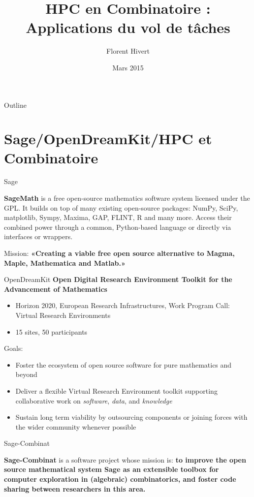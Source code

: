 \documentclass[compress,11pt]{beamer}
\title{\bf\LARGE HPC en Combinatoire :  \\
Applications du vol de tâches\\[5mm]}
\author{Florent Hivert}
\institute[LRI]{
  LRI / Université Paris Sud 11 / CNRS}
\date[Décembre 2014]{Mars 2015}
\begin{document}
\frame{\titlepage}

\begin{frame}{Outline}

  \tableofcontents
\end{frame}


\section{Sage/OpenDreamKit/HPC et Combinatoire}
\begin{frame}{Sage}

  \textbf{SageMath} is a free open-source mathematics software system licensed under
  the GPL. It builds on top of many existing open-source packages: NumPy,
  SciPy, matplotlib, Sympy, Maxima, GAP, FLINT, R and many more. Access their
  combined power through a common, Python-based language or directly via
  interfaces or wrappers.
  \bigskip

  Mission: \textbf{«Creating a viable free open source alternative to Magma, Maple,
  Mathematica and Matlab.»}
\end{frame}

\begin{frame}{OpenDreamKit}
  \textbf{\large Open Digital Research Environment Toolkit for the
    Advancement of Mathematics}
  \begin{itemize}
  \item Horizon 2020, European Research Infrastructures, Work Program
    Call: Virtual Research Environments
  \item 15 sites, 50 participants
  \end{itemize}
  {\color{red} Goals:}
  \begin{itemize}
  \item Foster the ecosystem of open source software for pure mathematics and
    beyond
  \item Deliver a flexible Virtual Research Environment toolkit supporting
    collaborative work on \emph{software}, \emph{data}, and \emph{knowledge}
  \item Sustain long term viability by outsourcing components or joining
    forces with the wider community whenever possible
  \end{itemize}
\end{frame}

\begin{frame}{Sage-Combinat}

  \textbf{Sage-Combinat} is a software project whose mission is: \textbf{to improve
    the open source mathematical system Sage as an extensible toolbox for
    computer exploration in (algebraic) combinatorics, and foster code sharing
    between researchers in this area.}
  \bigskip
\end{frame}
\end{document}
